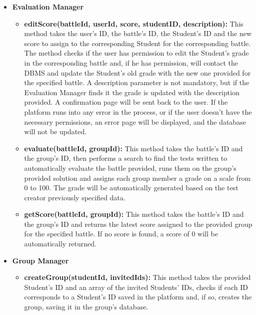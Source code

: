 \documentclass{article}
\begin{document}
{\begin{itemize}
\begin{itemize}
        the evaluated group's ID, then sends each group member a notification via e-mail, letting them know that a new score was assigned to them for their newly
        uploaded solution. This is achieved using external Notification APIs.
        \item \textbf{sendRegistrationNot(userId):} This method is called after a user's registration procedure is completed. Once the user's data is saved 
        in the user's database, an e-mail, containing a confirmation message for the registration procedure, is sent to the user.
        This is achieved using external Notification APIs.  
    \end{itemize}
    \item \textbf{Evaluation Manager}
    \begin{itemize}
        \item \textbf{editScore(battleId, userId, score, studentID, description):} This method takes the user's ID, the battle's ID, the Student's ID and the new score to assign to the 
        corresponding Student for the corresponding battle. The method checks if the user has permission to edit the Student's grade in the corresponding battle and, 
        if he has permission, will contact the DBMS and update the Student's old grade with the new one provided for the specified battle. A description parameter is not mandatory, 
        but if the Evaluation Manager finds it the grade is updated with the description provided. 
        A confirmation page will be sent back to the user.
        If the platform runs into any error in the process, or if the user doesn't have the necessary permissions, an error page will be displayed, and the database will not be
        updated.
        \item \textbf{evaluate(battleId, groupId):} This method takes the battle's ID and the group's ID, then performs a search to find the tests written to automatically
        evaluate the battle provided, runs them on the group's provided solution and assigns each group member a grade on a scale from 0 to 100.
        The grade will be automatically generated based on the test creator previously specified data.
        \item \textbf{getScore(battleId, groupId):}  This method takes the battle's ID and the group's ID and returns the latest score assigned to the provided group for the 
        specified battle. If no score is found, a score of 0 will be automatically returned.
    \end{itemize}
    \item \textbf{Group Manager}
    \begin{itemize}
        \item \textbf{createGroup(studentId, invitedIds):} This method takes the provided Student's ID and an array of the invited Students' IDs,
        checks if each ID corresponds to a Student's ID saved in the platform and, if so, creates the group, saving it in the group's database.
    \end{itemize}
\end{itemize}

}
\end{document}
